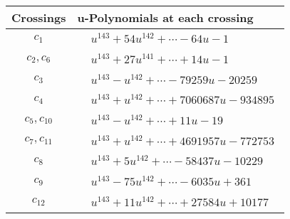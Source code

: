 \documentclass[1p]{elsarticle_modified}
\theoremstyle{definition}
\begin{document}
\begin{tabular}{m{50pt}|m{274pt}}
Crossings & \hspace{64pt}u-Polynomials at each crossing \\
\hline $$\begin{aligned}c_{1}\end{aligned}$$&$\begin{aligned}
&u^{143}+54 u^{142}+\cdots-64 u-1
\end{aligned}$\\
\hline $$\begin{aligned}c_{2},c_{6}\end{aligned}$$&$\begin{aligned}
&u^{143}+27 u^{141}+\cdots+14 u-1
\end{aligned}$\\
\hline $$\begin{aligned}c_{3}\end{aligned}$$&$\begin{aligned}
&u^{143}- u^{142}+\cdots-79259 u-20259
\end{aligned}$\\
\hline $$\begin{aligned}c_{4}\end{aligned}$$&$\begin{aligned}
&u^{143}+u^{142}+\cdots+7060687 u-934895
\end{aligned}$\\
\hline $$\begin{aligned}c_{5},c_{10}\end{aligned}$$&$\begin{aligned}
&u^{143}- u^{142}+\cdots+11 u-19
\end{aligned}$\\
\hline $$\begin{aligned}c_{7},c_{11}\end{aligned}$$&$\begin{aligned}
&u^{143}+u^{142}+\cdots+4691957 u-772753
\end{aligned}$\\
\hline $$\begin{aligned}c_{8}\end{aligned}$$&$\begin{aligned}
&u^{143}+5 u^{142}+\cdots-58437 u-10229
\end{aligned}$\\
\hline $$\begin{aligned}c_{9}\end{aligned}$$&$\begin{aligned}
&u^{143}-75 u^{142}+\cdots-6035 u+361
\end{aligned}$\\
\hline $$\begin{aligned}c_{12}\end{aligned}$$&$\begin{aligned}
&u^{143}+11 u^{142}+\cdots+27584 u+10177
\end{aligned}$\\
\hline
\end{tabular}\\~\\
\end{document}
